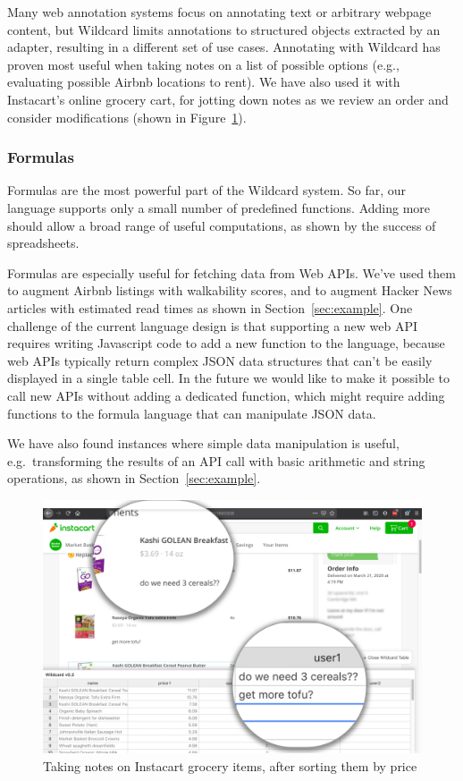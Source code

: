 \documentclass[sigplan,screen,10pt,anonymous,review]{acmart}
\begin{document}
Many web annotation systems focus on annotating text or arbitrary
webpage content, but Wildcard limits annotations to structured objects
extracted by an adapter, resulting in a different set of use cases.
Annotating with Wildcard has proven most useful when taking notes on a
list of possible options (e.g., evaluating possible Airbnb locations to
rent). We have also used it with Instacart's online grocery cart, for
jotting down notes as we review an order and consider modifications
(shown in Figure~\ref{fig:instacart}).

\hypertarget{formulas}{%
\subsubsection{Formulas}\label{formulas}}

Formulas are the most powerful part of the Wildcard system. So far, our
language supports only a small number of predefined functions. Adding
more should allow a broad range of useful computations, as shown by the
success of spreadsheets.

Formulas are especially useful for fetching data from Web APIs. We've
used them to augment Airbnb listings with walkability scores, and to
augment Hacker News articles with estimated read times as shown in
Section~\ref{sec:example}. One challenge of the current language design
is that supporting a new web API requires writing Javascript code to add
a new function to the language, because web APIs typically return
complex JSON data structures that can't be easily displayed in a single
table cell. In the future we would like to make it possible to call new
APIs without adding a dedicated function, which might require adding
functions to the formula language that can manipulate JSON data.

We have also found instances where simple data manipulation is useful,
e.g.~transforming the results of an API call with basic arithmetic and
string operations, as shown in Section~\ref{sec:example}.

\begin{figure}
\hypertarget{fig:instacart}{%
\centering
\includegraphics[width=\columnwidth]{media/instacart.png}
\caption{Taking notes on Instacart grocery items, after sorting them by price}\label{fig:instacart}
}
\end{figure}
\end{document}
